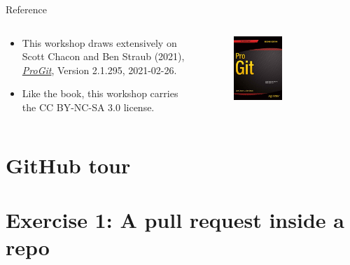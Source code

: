 \documentclass[handout]{beamer}
\begin{document}
\begin{frame}{Reference}
	\begin{columns}
	
		\begin{column}{0.5\textwidth}
			\begin{itemize}
				\item This workshop draws extensively on Scott Chacon and Ben Straub (2021), \href{https://git-scm.com/book/en/v2}{\textit{ProGit}}, Version 2.1.295, 2021-02-26. 
				\item Like the book, this workshop carries the CC BY-NC-SA 3.0 license.
			\end{itemize}
		\end{column}
		
		\begin{column}{0.5\textwidth}
			\begin{figure}
				\includegraphics[width=0.5\textwidth]{figures/progit_cover.png}
				\caption{}
			\end{figure}
		\end{column}
	
	\end{columns}
\end{frame}


\section{GitHub tour}

\section{Exercise 1: A pull request inside a repo}
\end{document}
